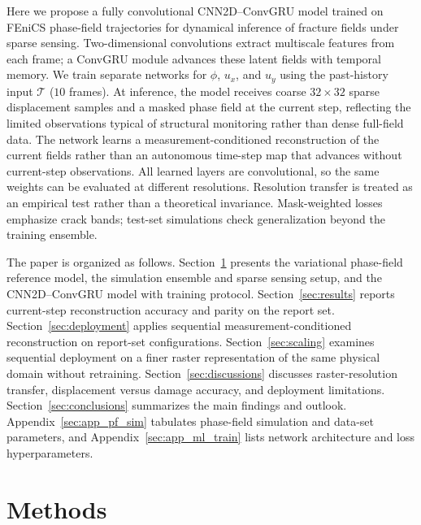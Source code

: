 \documentclass[10pt]{article}
\theoremstyle{definition}
\begin{document}
Here we propose a fully convolutional CNN2D--ConvGRU model trained on FEniCS phase-field trajectories for dynamical inference of fracture fields under sparse sensing.
%
Two-dimensional convolutions extract multiscale features from each frame; a ConvGRU module advances these latent fields with temporal memory.
%
We train separate networks for $\phi$, $u_x$, and $u_y$ using the past-history input $\mathcal{T}$ ($10$ frames).
%
At inference, the model receives coarse $32\times32$ sparse displacement samples and a masked phase field at the current step, reflecting the limited observations typical of structural monitoring rather than dense full-field data.
%
The network learns a measurement-conditioned reconstruction of the current fields rather than an autonomous time-step map that advances without current-step observations.
%
All learned layers are convolutional, so the same weights can be evaluated at different resolutions.
%
Resolution transfer is treated as an empirical test rather than a theoretical invariance.
%
Mask-weighted losses emphasize crack bands; test-set simulations check generalization beyond the training ensemble.
%

The paper is organized as follows.
%
Section~\ref{sec:methods} presents the variational phase-field reference model, the simulation ensemble and sparse sensing setup, and the CNN2D--ConvGRU model with training protocol.
%
Section~\ref{sec:results} reports current-step reconstruction accuracy and parity on the report set.
%
Section~\ref{sec:deployment} applies sequential measurement-conditioned reconstruction on report-set configurations.
%
Section~\ref{sec:scaling} examines sequential deployment on a finer raster representation of the same physical domain without retraining.
%
Section~\ref{sec:discussions} discusses raster-resolution transfer, displacement versus damage accuracy, and deployment limitations.
%
Section~\ref{sec:conclusions} summarizes the main findings and outlook.
%
Appendix~\ref{sec:app_pf_sim} tabulates phase-field simulation and data-set parameters, and Appendix~\ref{sec:app_ml_train} lists network architecture and loss hyperparameters.

\section{Methods}\label{sec:methods}
\end{document}

